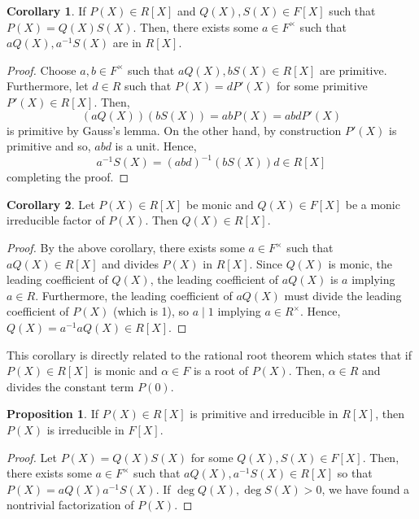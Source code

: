 \documentclass[]{article}
\theoremstyle{definition}
\newtheorem{corollary}{Corollary}[theorem]
\theoremstyle{definition}
\newtheorem{proposition}{Proposition}[section]
\begin{document}
\begin{corollary}
  If \(P(X) \in R[X]\) and \(Q(X), S(X) \in F[X]\) such that \(P(X) = Q(X)S(X)\).
  Then, there exists some \(a \in F^\times\) such that \(aQ(X), a^{-1}S(X)\) are 
  in \(R[X]\).
\end{corollary}
\begin{proof}
  Choose \(a, b \in F^\times\) such that \(aQ(X), bS(X) \in R[X]\) are primitive.
  Furthermore, let \(d \in R\) such that \(P(X) = dP'(X)\) for some primitive 
  \(P'(X) \in R[X]\). Then, 
  \[(aQ(X))(bS(X)) = abP(X) = abdP'(X)\]
  is primitive by Gauss's lemma. On the other hand, by construction \(P'(X)\) 
  is primitive and so, \(abd\) is a unit. Hence, 
  \[a^{-1}S(X) = (abd)^{-1}(bS(X))d \in R[X]\]
  completing the proof.
\end{proof}

\begin{corollary}
  Let \(P(X) \in R[X]\) be monic and \(Q(X) \in F[X]\) be a monic irreducible 
  factor of \(P(X)\). Then \(Q(X) \in R[X]\).
\end{corollary}
\begin{proof}
  By the above corollary, there exists some \(a \in F^\times\) such that 
  \(aQ(X) \in R[X]\) and divides \(P(X)\) in \(R[X]\). Since \(Q(X)\) is monic, 
  the leading coefficient of \(Q(X)\), the leading coefficient of \(aQ(X)\) 
  is \(a\) implying \(a \in R\). Furthermore, the leading coefficient of 
  \(aQ(X)\) must divide the leading coefficient of \(P(X)\) (which is 1), 
  so \(a \mid 1\) implying \(a \in R^\times\). Hence, \(Q(X) = a^{-1} aQ(X) \in R[X]\).
\end{proof}

This corollary is directly related to the rational root theorem which states that 
if \(P(X) \in R[X]\) is monic and \(\alpha \in F\) is a root of \(P(X)\). Then, 
\(\alpha \in R\) and divides the constant term \(P(0)\).

\begin{proposition}
  If \(P(X) \in R[X]\) is primitive and irreducible in \(R[X]\), then 
  \(P(X)\) is irreducible in \(F[X]\).
\end{proposition}
\begin{proof}
  Let \(P(X) = Q(X)S(X)\) for some \(Q(X), S(X) \in F[X]\). Then, there exists 
  some \(a \in F^\times\) such that \(aQ(X), a^{-1}S(X) \in R[X]\) so that 
  \(P(X) = aQ(X) a^{-1}S(X)\). If \(\deg Q(X), \deg S(X) > 0\), we have 
  found a nontrivial factorization of \(P(X)\).
\end{proof}
\end{document}
